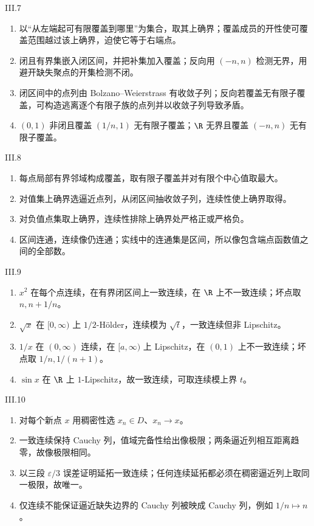 \begin{solution}{III.7}
\begin{enumerate}
 \item 以“从左端起可有限覆盖到哪里”为集合，取其上确界；覆盖成员的开性使可覆盖范围越过该上确界，迫使它等于右端点。
 \item 闭且有界集嵌入闭区间，并把补集加入覆盖；反向用 \((-n,n)\) 检测无界，用避开缺失聚点的开集检测不闭。
 \item 闭区间中的点列由 Bolzano--Weierstrass 有收敛子列；反向若覆盖无有限子覆盖，可构造逃离逐个有限子族的点列并以收敛子列导致矛盾。
 \item \((0,1)\) 非闭且覆盖 \((1/n,1)\) 无有限子覆盖；\(\R\) 无界且覆盖 \((-n,n)\) 无有限子覆盖。
\end{enumerate}
\end{solution}

\begin{solution}{III.8}
\begin{enumerate}
 \item 每点局部有界邻域构成覆盖，取有限子覆盖并对有限个中心值取最大。
 \item 对值集上确界选逼近点列，从闭区间抽收敛子列，连续性使上确界取得。
 \item 对负值点集取上确界，连续性排除上确界处严格正或严格负。
 \item 区间连通，连续像仍连通；实线中的连通集是区间，所以像包含端点函数值之间的全部数。
\end{enumerate}
\end{solution}

\begin{solution}{III.9}
\begin{enumerate}
 \item \(x^2\) 在每个点连续，在有界闭区间上一致连续，在 \(\R\) 上不一致连续；坏点取 \(n,n+1/n\)。
 \item \(\sqrt x\) 在 \([0,\infty)\) 上 \(1/2\)-Hölder，连续模为 \(\sqrt t\)，一致连续但非 Lipschitz。
 \item \(1/x\) 在 \((0,\infty)\) 连续，在 \([a,\infty)\) 上 Lipschitz，在 \((0,1)\) 上不一致连续；坏点取 \(1/n,1/(n+1)\)。
 \item \(\sin x\) 在 \(\R\) 上 \(1\)-Lipschitz，故一致连续，可取连续模上界 \(t\)。
\end{enumerate}
\end{solution}

\begin{solution}{III.10}
\begin{enumerate}
 \item 对每个新点 \(x\) 用稠密性选 \(x_n\in D\)、\(x_n\to x\)。
 \item 一致连续保持 Cauchy 列，值域完备性给出像极限；两条逼近列相互距离趋零，故像极限相同。
 \item 以三段 \(\varepsilon/3\) 误差证明延拓一致连续；任何连续延拓都必须在稠密逼近列上取同一极限，故唯一。
 \item 仅连续不能保证逼近缺失边界的 Cauchy 列被映成 Cauchy 列，例如 \(1/n\mapsto n\)。
\end{enumerate}
\end{solution}

